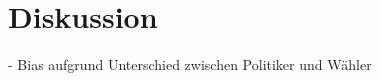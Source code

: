 
\chapter{Diskussion} \label{ch:discussion}

- Bias aufgrund Unterschied zwischen Politiker und Wähler
